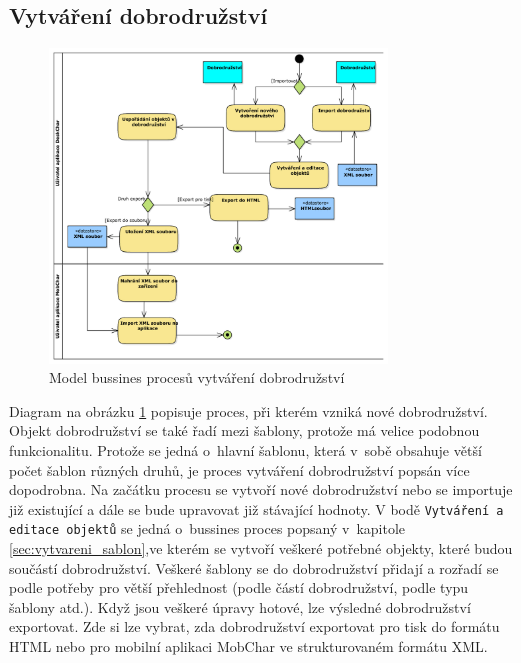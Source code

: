 \documentclass[thesis=B,czech]{resources/FITthesis}[2012/06/26]
\begin{document}
\subsection{Vytváření dobrodružství}
\begin{figure}\centering
	\includegraphics[width=0.8\textwidth]{images/business_dobrodruzstvi}
	\caption[Business proces vytváření dobrodružství]{Model bussines procesů vytváření dobrodružství}\label{fig:bp_dobrodruzsvi}
\end{figure}
Diagram na obrázku \ref{fig:bp_dobrodruzsvi} popisuje proces, při kterém vzniká nové dobrodružství. Objekt dobrodružství se také řadí mezi šablony, protože má velice podobnou funkcionalitu. Protože se jedná o~hlavní šablonu, která v~sobě obsahuje větší počet šablon různých druhů, je proces vytváření dobrodružství popsán více dopodrobna. Na začátku procesu se vytvoří nové dobrodružství nebo se importuje již existující a dále se bude upravovat již stávající hodnoty. V bodě \texttt{Vytváření a editace objektů} se jedná o~bussines proces popsaný v~kapitole \ref{sec:vytvareni_sablon},ve kterém se vytvoří veškeré potřebné objekty, které budou součástí dobrodružství. Veškeré šablony se do dobrodružství přidají a rozřadí se podle potřeby pro větší přehlednost (podle částí dobrodružství, podle typu šablony atd.). Když jsou veškeré úpravy hotové, lze výsledné dobrodružství exportovat. Zde si lze vybrat, zda dobrodružství exportovat pro tisk do formátu HTML nebo pro mobilní aplikaci MobChar ve strukturovaném formátu XML.
\end{document}
